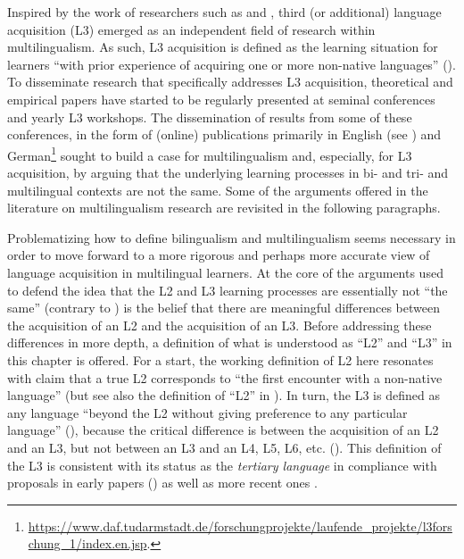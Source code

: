 \documentclass[output=paper]{../langscibook}
\begin{document}
Inspired by the work of researchers such as \citet{Hufeisen1998, Hufeisen2003} and \citet{DeAngelis2007}, third (or additional) language acquisition (L3) emerged as an independent field of research within multilingualism. As such, L3 acquisition is defined as the learning situation for learners “with prior experience of acquiring one or more non-native languages” (\citealt[128]{Hammarberg2018}). To disseminate research that specifically addresses L3 acquisition, theoretical and empirical papers have started to be regularly presented at seminal conferences and yearly L3 workshops. The dissemination of results from some of these conferences, in the form of (online) publications primarily in English (see \citealt{CenozEtAl2001}) and German\footnote{\url{https://www.daf.tudarmstadt.de/forschungprojekte/laufende_projekte/l3forschung_1/index.en.jsp}.} sought to build a case for multilingualism and, especially, for L3 acquisition, by arguing that the underlying learning processes in bi- and tri- and multilingual contexts are not the same. Some of the arguments offered in the literature on multilingualism research are revisited in the following paragraphs.

Problematizing how to define bilingualism and multilingualism seems necessary in order to move forward to a more rigorous and perhaps more accurate view of language acquisition in multilingual learners. At the core of the arguments used to defend the idea that the L2 and L3 learning processes are essentially not “the same” (contrary to \citealt{MitchellMyles1998}) is the belief that there are meaningful differences between the acquisition of an L2 and the acquisition of an L3. Before addressing these differences in more depth, a definition of what is understood as ``L2'' and ``L3'' in this chapter is offered. For a start, the working definition of L2 here resonates with  claim that a true L2 corresponds to “the first encounter with a non-native language” (but see also the definition of ``L2'' in ). In turn, the L3 is defined as any language “beyond the L2 without giving preference to any particular language” (\citealt[11]{DeAngelis2007}), because the critical difference is between the acquisition of an L2 and an L3, but not between an L3 and an L4, L5, L6, etc. (\citealt{Hammarberg2001, Hufeisen2003, DeAngelis2007}). This definition of the L3 is consistent with its status as the \textit{tertiary language} in compliance with proposals in early papers (\citealt{LindemannHufeisen1998, DentlerEtAl2000}) as well as more recent ones \citep{Hammarberg2018}.
\end{document}
